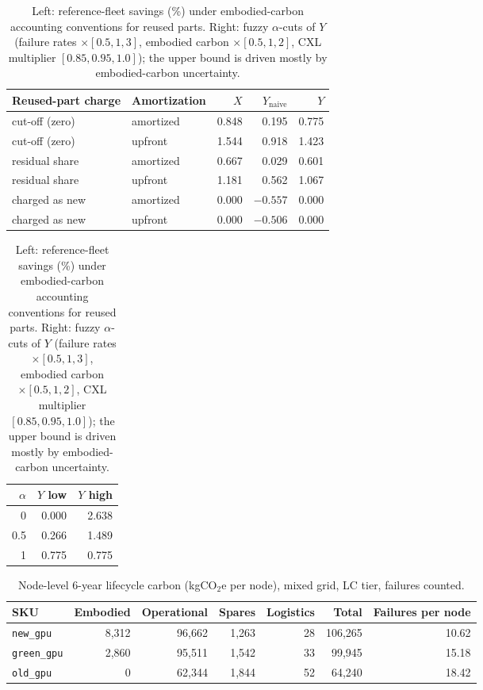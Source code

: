 \documentclass{article} %
\begin{document}
\begin{table}[h]
\caption{Left: reference-fleet savings (\%) under embodied-carbon accounting conventions for reused parts. Right: fuzzy $\alpha$-cuts of $Y$ (failure rates $\times[0.5,1,3]$, embodied carbon $\times[0.5,1,2]$, CXL multiplier $[0.85,0.95,1.0]$); the upper bound is driven mostly by embodied-carbon uncertainty.}
\label{tab:accounting}
\begin{center}
\small
\begin{tabular}{llrrr}
\toprule
Reused-part charge & Amortization & $X$ & $Y_{\text{naive}}$ & $Y$ \\
\midrule
cut-off (zero) & amortized & 0.848 & 0.195 & 0.775 \\
cut-off (zero) & upfront & 1.544 & 0.918 & 1.423 \\
residual share & amortized & 0.667 & 0.029 & 0.601 \\
residual share & upfront & 1.181 & 0.562 & 1.067 \\
charged as new & amortized & 0.000 & $-0.557$ & 0.000 \\
charged as new & upfront & 0.000 & $-0.506$ & 0.000 \\
\bottomrule
\end{tabular}
\quad
\begin{tabular}{rrr}
\toprule
$\alpha$ & $Y$ low & $Y$ high \\
\midrule
0 & 0.000 & 2.638 \\
0.5 & 0.266 & 1.489 \\
1 & 0.775 & 0.775 \\
\bottomrule
\end{tabular}
\end{center}
\end{table}

\begin{table}[h]
\caption{Node-level 6-year lifecycle carbon (kgCO$_2$e per node), mixed grid, LC tier, failures counted.}
\label{tab:node}
\begin{center}
\small
\begin{tabular}{lrrrrrr}
\toprule
SKU & Embodied & Operational & Spares & Logistics & Total & Failures per node \\
\midrule
\texttt{new\_gpu} & 8,312 & 96,662 & 1,263 & 28 & 106,265 & 10.62 \\
\texttt{green\_gpu} & 2,860 & 95,511 & 1,542 & 33 & 99,945 & 15.18 \\
\texttt{old\_gpu} & 0 & 62,344 & 1,844 & 52 & 64,240 & 18.42 \\
\bottomrule
\end{tabular}
\end{center}
\end{table}
\end{document}
